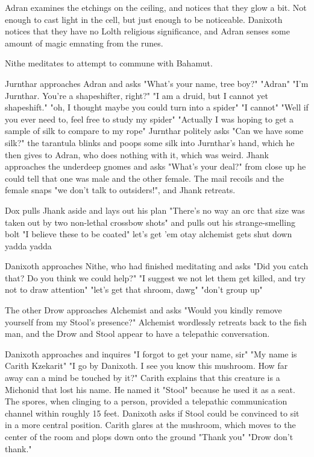 \documentclass[letterpaper,10pt,twoside,twocolumn,openany]{book}
\begin{document}
Adran examines the etchings on the ceiling, and notices that they glow a bit. Not enough to cast light in the cell, but just enough to be noticeable. Danixoth notices that they have no Lolth religious significance, and Adran senses some amount of magic emnating from the runes. 

Nithe meditates to attempt to commune with Bahamut.

Jurnthar approaches Adran and asks "What's your name, tree boy?" "Adran" "I'm Jurnthar. You're a shapeshifter, right?" "I am a druid, but I cannot yet shapeshift." "oh, I thought maybe you could turn into a spider" "I cannot" "Well if you ever need to, feel free to study my spider" "Actually I was hoping to get a sample of silk to compare to my rope" Jurnthar politely asks "Can we have some silk?" the tarantula blinks and poops some silk into Jurnthar's hand, which he then gives to Adran, who does nothing with it, which was weird. Jhank approaches the underdeep gnomes and asks "What's your deal?" from close up he could tell that one was male and the other female. The mail recoils and the female snaps "we don't talk to outsiders!", and Jhank retreats.

Dox pulls Jhank aside and lays out his plan "There's no way an orc that size was taken out by two non-lethal crossbow shots" and pulls out his strange-smelling bolt "I believe these to be coated" let's get 'em otay alchemist gets shut down yadda yadda

Danixoth approaches Nithe, who had finished meditating and asks "Did you catch that? Do you think we could help?" "I suggest we not let them get killed, and try not to draw attention" "let's get that shroom, dawg" "don't group up"

The other Drow approaches Alchemist and asks "Would you kindly remove yourself from my Stool's presence?" Alchemist wordlessly retreats back to the fish man, and the Drow and Stool appear to have a telepathic conversation.

Danixoth approaches and inquires "I forgot to get your name, sir" "My name is Carith Kzekarit" "I go by Danixoth. I see you know this mushroom. How far away can a mind be touched by it?" Carith explains that this creature is a Michonid that lost his name. He named it "Stool" because he used it as a seat. The spores, when clinging to a person, provided a telepathic communication channel within roughly 15 feet. Danixoth asks if Stool could be convinced to sit in a more central position. Carith glares at the mushroom, which moves to the center of the room and plops down onto the ground "Thank you" "Drow don't thank."
\end{document}
